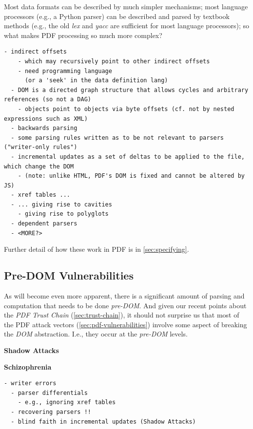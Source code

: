Most data formats can be described by much simpler mechanisms;
most language processors (e.g., a Python parser) can be described and parsed by
textbook methods (e.g., the old \emph{lex} and \emph{yacc} are sufficient for
most language processors);
so what makes PDF processing so much more complex?
\begin{lstlisting}[style=meta]
  - indirect offsets
    - which may recursively point to other indirect offsets
    - need programming language
      (or a 'seek' in the data definition lang)
  - DOM is a directed graph structure that allows cycles and arbitrary references (so not a DAG)
    - objects point to objects via byte offsets (cf. not by nested expressions such as XML)  
  - backwards parsing
  - some parsing rules written as to be not relevant to parsers ("writer-only rules")
  - incremental updates as a set of deltas to be applied to the file, which change the DOM
    - (note: unlike HTML, PDF's DOM is fixed and cannot be altered by JS)
  - xref tables ...
  - ... giving rise to cavities
    - giving rise to polyglots
  - dependent parsers
  - <MORE?>
\end{lstlisting}

Further detail of how these work in PDF is in \cref{sec:specifying}.

\subsection{Pre-DOM Vulnerabilities }
\label{sec:predom-vulnerabilities}

As will become even more apparent, there is a significant amount of
parsing and computation that needs to be done \emph{pre-DOM}.
And given our recent points about the \emph{PDF Trust Chain}
(\cref{sec:trust-chain}),
it should not surprise us that most of the PDF attack vectors
(\cref{sec:pdf-vulnerabilities})
involve some aspect of breaking the \emph{DOM} abstraction.
I.e., they occur at the \emph{pre-DOM} levels.

{\bf{Shadow Attacks}} 

{\bf{Schizophrenia}} 
\begin{lstlisting}[style=meta]
  - writer errors
  - parser differentials
    - e.g., ignoring xref tables
  - recovering parsers !!
  - blind faith in incremental updates (Shadow Attacks)
\end{lstlisting}

